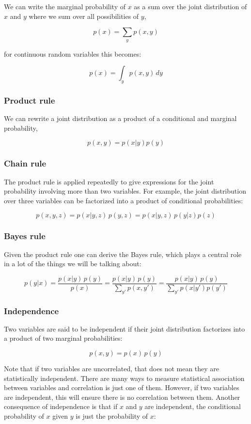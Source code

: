 \documentclass[11pt]{article}
\begin{document}
We can write the marginal probability of \(x\) as a sum over the joint
distribution of \(x\) and \(y\) where we sum over all possibilities of
\(y\),

\[p(x) = \sum_y p(x,y) \]

for continuous random variables this becomes:

\[ p(x) = \int_y p(x,y) \, dy \]

    \subsubsection{Product rule}\label{product-rule}

We can rewrite a joint distribution as a product of a conditional and
marginal probability,

\[ p(x,y) = p(x|y) p(y) \]

    \subsubsection{Chain rule}\label{chain-rule}

The product rule is applied repeatedly to give expressions for the joint
probability involving more than two variables. For example, the joint
distribution over three variables can be factorized into a product of
conditional probabilities:

\[ p(x,y,z) = p(x|y,z) \, p(y,z) = p(x |y,z) \, p(y|z) p(z) \]

    \subsubsection{Bayes rule}\label{bayes-rule}

Given the product rule one can derive the Bayes rule, which plays a
central role in a lot of the things we will be talking about:

\[ p(y|x) = \frac{p(x|y) \, p(y) }{p(x)} = \frac{p(x|y) \, p(y) }{\sum_{y'} p(x,y')} = \frac{p(x|y) \, p(y) }{\sum_{y'} p(x|y')p(y')}\]

    \subsubsection{Independence}\label{independence}

Two variables are said to be independent if their joint distribution
factorizes into a product of two marginal probabilities:

\[ p(x,y) = p(x) \, p(y) \]

Note that if two variables are uncorrelated, that does not mean they are
statistically independent. There are many ways to measure statistical
association between variables and correlation is just one of them.
However, if two variables are independent, this will ensure there is no
correlation between them. Another consequence of independence is that if
\(x\) and \(y\) are independent, the conditional probability of \(x\)
given \(y\) is just the probability of \(x\):
\end{document}
